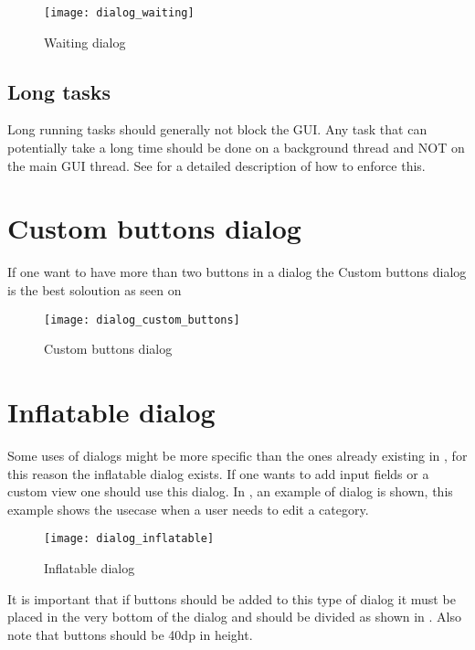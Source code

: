 \begin{figure}[h]
	\centering
	\texttt{[image: dialog\_waiting]}
	\caption{Waiting dialog}
	\label{fig:dialog_waiting}
\end{figure}
\FloatBarrier

\subsection{Long tasks}
\label{sub:long_tasks}
Long running tasks should generally not block the GUI. Any task that can potentially take a long time should be done on a background thread and NOT on the main GUI thread. See  for a detailed description of how to enforce this. 

\section{Custom buttons dialog}
\label{sec:custom_buttons_dialog}

If one want to have more than two buttons in a dialog the Custom buttons dialog is the best soloution as seen on 

\begin{figure}[h]
	\centering
	\texttt{[image: dialog\_custom\_buttons]}
	\caption{Custom buttons dialog}
	\label{fig:custom_buttons_dialog}
\end{figure}
\FloatBarrier

\section{Inflatable dialog}
\label{sec:inflatable_dialog}

Some uses of dialogs might be more specific than the ones already existing in \gc, for this reason the inflatable dialog exists. If one wants to add input fields or a custom view one should use this dialog. In , an example of dialog is shown, this example shows the usecase when a user needs to edit a category.

\begin{figure}[h]
	\centering
	\texttt{[image: dialog\_inflatable]}
	\caption{Inflatable dialog}
	\label{fig:inflatable_dialog}
\end{figure}
\FloatBarrier

\begin{note}
	It is important that if buttons should be added to this type of dialog it must be placed in the very bottom of the dialog and should be divided as shown in . Also note that buttons should be 40dp in height.
\end{note}
